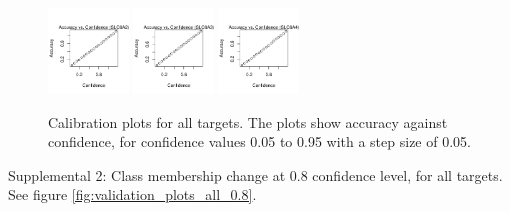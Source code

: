\documentclass[10pt,article]{memoir}
\begin{document}
\begin{figure}[h!]
\includegraphics[width=0.19\textwidth]{figures/calibration_plots/slc6a2_calib.pdf}
\includegraphics[width=0.19\textwidth]{figures/calibration_plots/slc6a3_calib.pdf}
\includegraphics[width=0.19\textwidth]{figures/calibration_plots/slc6a4_calib.pdf}

    \caption{Calibration plots for all targets. The plots show accuracy against
        confidence, for confidence values 0.05 to 0.95 with a step size of 0.05.}
    \label{fig:calibration_plots_all}
\end{figure}

Supplemental 2: Class membership change at 0.8 confidence level, for all
targets. See figure \ref{fig:validation_plots_all_0.8}.
\end{document}

